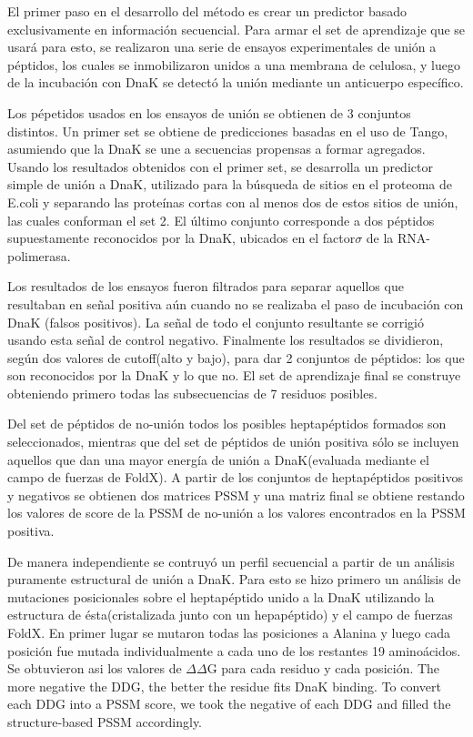 El primer paso en el desarrollo del método es crear un predictor basado exclusivamente en información secuencial.
Para armar el set de aprendizaje que se usará para esto, se realizaron una serie de ensayos experimentales de unión a péptidos, los cuales se inmobilizaron unidos a una membrana de celulosa, 
y luego de la incubación con DnaK se detectó la unión mediante un anticuerpo específico.

Los pépetidos usados en los ensayos de unión se obtienen de 3 conjuntos distintos. Un primer set se obtiene de predicciones basadas en el uso de Tango, asumiendo que la DnaK se une a secuencias propensas a formar agregados.
Usando los resultados obtenidos con el primer set, se desarrolla un predictor simple de unión a DnaK, utilizado para la búsqueda de sitios en el proteoma de E.coli 
y separando las proteínas cortas con al menos dos de estos sitios de unión, las cuales conforman el set 2. El último conjunto corresponde a dos péptidos supuestamente reconocidos por la DnaK, ubicados en el factor$\sigma$ de la RNA-polimerasa.

Los resultados de los ensayos fueron filtrados para separar aquellos que resultaban en señal positiva aún cuando no se realizaba el paso de incubación con DnaK (falsos positivos). 
La señal de todo el conjunto resultante se corrigió usando esta señal de control negativo. Finalmente los resultados se dividieron, según dos valores de cutoff(alto y bajo), para dar 2 conjuntos de péptidos:
los que son reconocidos por la DnaK y lo que no. El set de aprendizaje final se construye obteniendo primero todas las subsecuencias de 7 residuos posibles. 

Del set de péptidos de no-unión todos los posibles heptapéptidos formados son seleccionados, 
mientras que del set de péptidos de unión positiva sólo se incluyen aquellos que dan una mayor energía de unión a DnaK(evaluada mediante el campo de fuerzas de FoldX).
A partir de los conjuntos de heptapéptidos positivos y negativos se obtienen dos matrices PSSM y una matriz final se obtiene restando los valores de score de la PSSM de no-unión a los valores encontrados en la PSSM positiva.

De manera independiente se contruyó un perfil secuencial a partir de un análisis puramente estructural de unión a DnaK.
Para esto se hizo primero un análisis de mutaciones posicionales sobre el heptapéptido unido a la DnaK utilizando la estructura de ésta(cristalizada junto con un hepapéptido) y el campo de fuerzas FoldX. 
En primer lugar se mutaron todas las posiciones a Alanina y luego cada posición fue mutada individualmente a cada uno de los restantes 19 aminoácidos.
Se obtuvieron asi los valores de $\Delta\Delta$G para cada residuo y cada posición. 
The more
negative the DDG, the better the residue fits DnaK binding. To
convert each DDG into a PSSM score, we took the negative of
each DDG and filled the structure-based PSSM accordingly.


